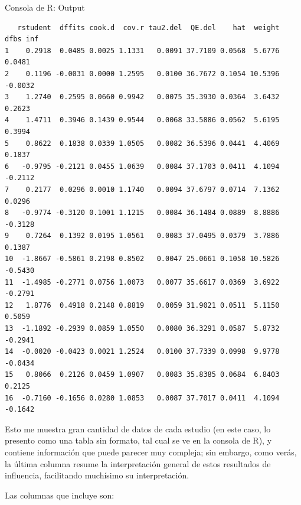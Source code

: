 \documentclass[
  bookmarksnumbered]{article}
\begin{document}
\begin{ROut}{Consola de R: Output~\thetcbcounter}
                \begin{footnotesize}
                \begin{verbatim} 
   rstudent  dffits cook.d  cov.r tau2.del  QE.del    hat  weight    dfbs inf 
1    0.2918  0.0485 0.0025 1.1331   0.0091 37.7109 0.0568  5.6776  0.0481     
2    0.1196 -0.0031 0.0000 1.2595   0.0100 36.7672 0.1054 10.5396 -0.0032     
3    1.2740  0.2595 0.0660 0.9942   0.0075 35.3930 0.0364  3.6432  0.2623     
4    1.4711  0.3946 0.1439 0.9544   0.0068 33.5886 0.0562  5.6195  0.3994     
5    0.8622  0.1838 0.0339 1.0505   0.0082 36.5396 0.0441  4.4069  0.1837     
6   -0.9795 -0.2121 0.0455 1.0639   0.0084 37.1703 0.0411  4.1094 -0.2112     
7    0.2177  0.0296 0.0010 1.1740   0.0094 37.6797 0.0714  7.1362  0.0296     
8   -0.9774 -0.3120 0.1001 1.1215   0.0084 36.1484 0.0889  8.8886 -0.3128     
9    0.7264  0.1392 0.0195 1.0561   0.0083 37.0495 0.0379  3.7886  0.1387     
10  -1.8667 -0.5861 0.2198 0.8502   0.0047 25.0661 0.1058 10.5826 -0.5430     
11  -1.4985 -0.2771 0.0756 1.0073   0.0077 35.6617 0.0369  3.6922 -0.2791     
12   1.8776  0.4918 0.2148 0.8819   0.0059 31.9021 0.0511  5.1150  0.5059     
13  -1.1892 -0.2939 0.0859 1.0550   0.0080 36.3291 0.0587  5.8732 -0.2941     
14  -0.0020 -0.0423 0.0021 1.2524   0.0100 37.7339 0.0998  9.9778 -0.0434     
15   0.8066  0.2126 0.0459 1.0907   0.0083 35.8385 0.0684  6.8403  0.2125     
16  -0.7160 -0.1656 0.0280 1.0853   0.0087 37.7017 0.0411  4.1094 -0.1642     
 \end{verbatim}
                \end{footnotesize}
                \end{ROut}

Esto me muestra gran cantidad de datos de cada estudio (en este caso, lo presento como una tabla sin formato, tal cual se ve en la consola de R), y contiene información que puede parecer muy compleja; sin embargo, como verás, la última columna resume la interpretación general de estos resultados de influencia, facilitando muchísimo su interpretación.

Las columnas que incluye son:
\end{document}
